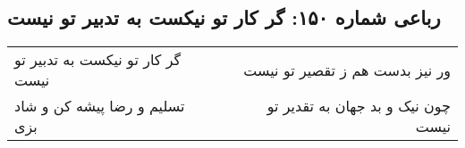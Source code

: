 \begin{center}
\section*{رباعی شماره ۱۵۰: گر کار تو نیکست به تدبیر تو نیست}
\label{sec:sh150}
\begin{longtable}{l p{0.5cm} r}
گر کار تو نیکست به تدبیر تو نیست
&&
ور نیز بدست هم ز تقصیر تو نیست
\\
تسلیم و رضا پیشه کن و شاد بزی
&&
چون نیک و بد جهان به تقدیر تو نیست
\\
\end{longtable}
\end{center}
